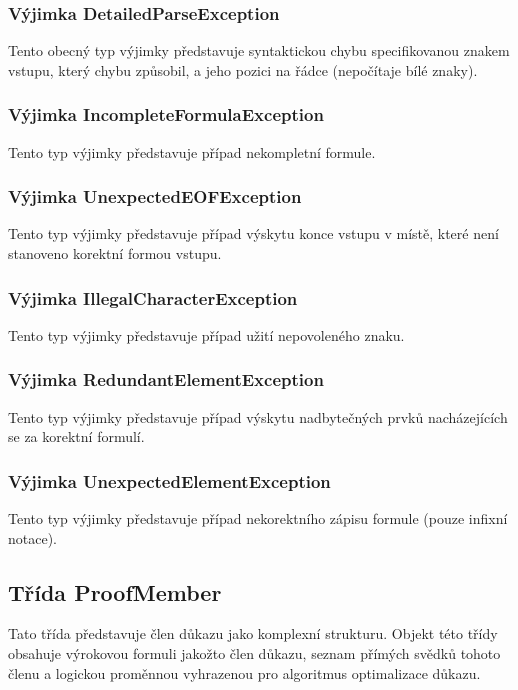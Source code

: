 \documentclass[thesis=B,czech,hidelinks]{thesis}[2012/06/26]
\begin{document}
\subsubsection{Výjimka DetailedParseException}

Tento obecný typ výjimky představuje syntaktickou chybu specifikovanou znakem vstupu, který chybu způsobil, a jeho pozici na řádce (nepočítaje bílé znaky).

\subsubsection{Výjimka IncompleteFormulaException}

Tento typ výjimky představuje případ nekompletní formule.

\subsubsection{Výjimka UnexpectedEOFException}

Tento typ výjimky představuje případ výskytu konce vstupu v místě, které není stanoveno korektní formou vstupu.

\subsubsection{Výjimka IllegalCharacterException}

Tento typ výjimky představuje případ užití nepovoleného znaku.

\subsubsection{Výjimka RedundantElementException}

Tento typ výjimky představuje případ výskytu nadbytečných prvků nacházejících se za korektní formulí.

\subsubsection{Výjimka UnexpectedElementException}

Tento typ výjimky představuje případ nekorektního zápisu formule (pouze infixní notace).

\subsection{Třída ProofMember}

Tato třída představuje člen důkazu jako komplexní strukturu. Objekt této třídy obsahuje výrokovou formuli jakožto člen důkazu, seznam přímých svědků tohoto členu a logickou proměnnou vyhrazenou pro algoritmus optimalizace důkazu.
\end{document}
